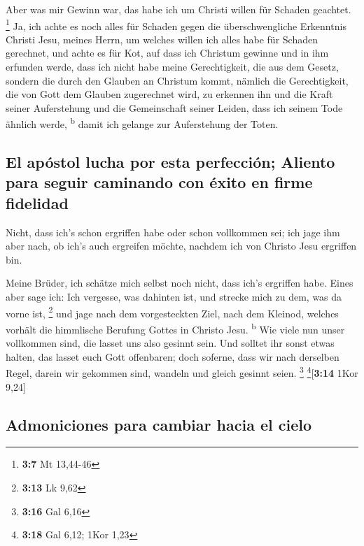 Aber was mir Gewinn war, das habe ich um Christi willen
für Schaden geachtet. \footnote{\textbf{3:7} Mt 13,44-46} 
Ja, ich achte es noch alles für Schaden gegen die überschwengliche
Erkenntnis Christi Jesu, meines Herrn, um welches willen ich alles habe
für Schaden gerechnet, und achte es für Kot, auf dass ich Christum
gewinne  und in ihm erfunden werde, dass ich nicht habe
meine Gerechtigkeit, die aus dem Gesetz, sondern die durch den Glauben
an Christum kommt, nämlich die Gerechtigkeit, die von Gott dem Glauben
zugerechnet wird,  zu erkennen ihn und die Kraft seiner
Auferstehung und die Gemeinschaft seiner Leiden, dass ich seinem Tode
ähnlich werde, \textsuperscript{b}  damit ich gelange zur
Auferstehung der Toten.

\hypertarget{el-apuxf3stol-lucha-por-esta-perfecciuxf3n-aliento-para-seguir-caminando-con-uxe9xito-en-firme-fidelidad}{%
\subsection{El apóstol lucha por esta perfección; Aliento para seguir
caminando con éxito en firme
fidelidad}\label{el-apuxf3stol-lucha-por-esta-perfecciuxf3n-aliento-para-seguir-caminando-con-uxe9xito-en-firme-fidelidad}}

 Nicht, dass ich's schon ergriffen habe oder schon
vollkommen sei; ich jage ihm aber nach, ob ich's auch ergreifen möchte,
nachdem ich von Christo Jesu ergriffen bin.

 Meine Brüder, ich schätze mich selbst noch nicht, dass
ich's ergriffen habe. Eines aber sage ich: Ich vergesse, was dahinten
ist, und strecke mich zu dem, was da vorne ist, \footnote{\textbf{3:13}
  Lk 9,62}  und jage nach dem vorgesteckten Ziel, nach
dem Kleinod, welches vorhält die himmlische Berufung Gottes in Christo
Jesu. \textsuperscript{b}  Wie viele nun unser vollkommen
sind, die lasset uns also gesinnt sein. Und solltet ihr sonst etwas
halten, das lasset euch Gott offenbaren;  doch soferne,
dass wir nach derselben Regel, darein wir gekommen sind, wandeln und
gleich gesinnt seien. \footnote{\textbf{3:16} Gal 6,16}
\footnote{\textbf{3:18} Gal 6,12; 1Kor 1,23}{[}\textbf{3:14} 1Kor
9,24{]}

\hypertarget{admoniciones-para-cambiar-hacia-el-cielo}{%
\subsection{Admoniciones para cambiar hacia el
cielo}\label{admoniciones-para-cambiar-hacia-el-cielo}}

